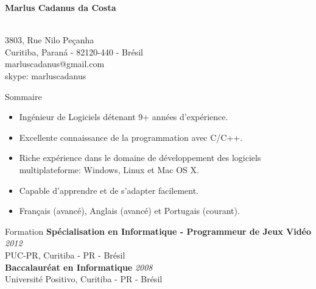 \documentclass{resume}
\begin{document}
\begin{center}
  {\fontsize{16}{18} \bf Marlus Cadanus da Costa} \\\\
\end{center}
\begin{center}
  {\fontsize{12}{14} 3803, Rue Nilo Peçanha} \\ 
  {\fontsize{12}{14} Curitiba, Paraná - 82120-440 - Brésil} \\
  {\fontsize{12}{14} marluscadanus@gmail.com} \\
  {\fontsize{12}{14} skype: marluscadanus}
\end{center}

  \begin{rSection}{Sommaire}
  \end{rSection}

    \begin{itemize}
       \item Ingénieur de Logiciels détenant 9+ années d’expérience.
       \item Excellente connaissance de la programmation avec C/C++.
       \item Riche expérience dans le domaine de développement des logiciels multiplateforme: Windows, Linux et Mac OS X.
       \item Capable d'apprendre et de s'adapter facilement.
       \item Français (avancé), Anglais (avancé) et Portugais (courant).
    \end{itemize}

  \begin{rSection}{Formation}
    {\bf Spécialisation en Informatique - Programmeur de Jeux Vidéo } \hfill {\em 2012} \\
    {PUC-PR, Curitiba - PR - Brésil} \\ 

    {\bf Baccalauréat en Informatique } \hfill {\em 2008} \\
    {Université Positivo, Curitiba - PR - Brésil}   
  \end{rSection}
  
\end{document}
